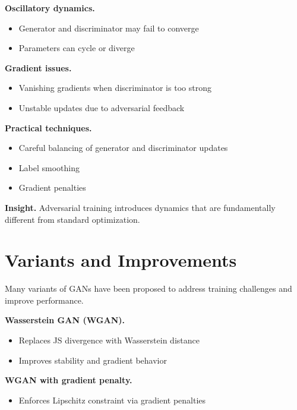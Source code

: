 \medskip

\noindent
\textbf{Oscillatory dynamics.}
\begin{itemize}
    \item Generator and discriminator may fail to converge
    \item Parameters can cycle or diverge
\end{itemize}

\medskip

\noindent
\textbf{Gradient issues.}
\begin{itemize}
    \item Vanishing gradients when discriminator is too strong
    \item Unstable updates due to adversarial feedback
\end{itemize}

\medskip

\noindent
\textbf{Practical techniques.}
\begin{itemize}
    \item Careful balancing of generator and discriminator updates
    \item Label smoothing
    \item Gradient penalties
\end{itemize}

\medskip

\noindent
\textbf{Insight.}  
Adversarial training introduces dynamics that are fundamentally different from standard optimization.

\section{Variants and Improvements}

Many variants of GANs have been proposed to address training challenges and improve performance.

\medskip

\noindent
\textbf{Wasserstein GAN (WGAN).}
\begin{itemize}
    \item Replaces JS divergence with Wasserstein distance
    \item Improves stability and gradient behavior
\end{itemize}

\medskip

\noindent
\textbf{WGAN with gradient penalty.}
\begin{itemize}
    \item Enforces Lipschitz constraint via gradient penalties
\end{itemize}


